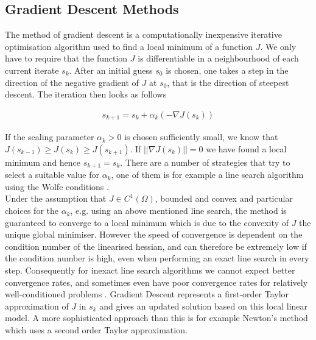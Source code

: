 \documentclass[../draft_1.tex]{subfiles}
\begin{document}
\subsection{Gradient Descent Methods}
The method of gradient descent is a computationally inexpensive iterative optimisation algorithm used to find a local minimum of a function $J$. We only have to require that the function $J$ is differentiable in a neighbourhood of each current iterate $s_k$. After an initial guess $s_0$ is chosen, one takes a step in the direction of the negative gradient of $J$ at $s_0$, that is the direction of steepest descent. The iteration then looks as follows 
\begin{ceqn}
	\begin{align}
	s_{k+1} = s_k + \alpha_k (- \nabla J(s_k))
	\end{align}
\end{ceqn}
If the scaling parameter $\alpha_k > 0 $ is chosen sufficiently small, we know that $J(s_{k-1}) \geq J(s_{k})  \geq J(s_{k+1})$. If $ || \nabla J(s_k) || = 0$ we have found a local minimum and hence $s_{k+1} = s_k$. There are a number of strategies that try to select a suitable value for $\alpha_k$, one of them is for example a line search algorithm using the Wolfe conditions \cite{NoceWrig99}.
\smallskip
\\
Under the assumption that $J \in C^1(\Omega)$, bounded and convex and particular choices for the $\alpha_k$, e.g. using an above mentioned line search, the method is guaranteed to converge to a local minimum which is due to the convexity of $J$ the unique global minimiser. However the speed of convergence is dependent on the condition number of the linearised hessian, and can therefore be extremely low if the condition number is high, even when performing an exact line search in every step. Consequently for inexact line search algorithms we cannot expect better convergence rates, and sometimes even have poor convergence rates for relatively well-conditioned problems \cite{NoceWrig99}. Gradient Descent represents a first-order Taylor approximation of $J$ in $s_k$ and gives an updated solution based on this local linear model. A more sophisticated approach than this is for example Newton's method which uses a second order Taylor approximation. 
\end{document}

